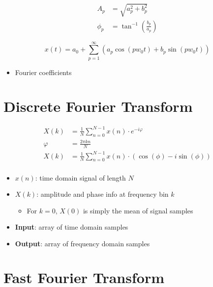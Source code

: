     \begin{align}
      A_{p} &= \sqrt{a_{p}^{2} + b_{p}^{2}} \\
      \phi_{p} &= \tan^{-1} \left( \frac{b_{p}}{a_{p}} \right)
    \end{align}

    \begin{equation}
      x\left( t \right) = a_{0}
        + \sum_{p = 1}^{\infty}
        \left(
          a_{p} \cos\left( p w_{0} t \right)
          + b_{p} \sin\left( p w_{0} t \right)
        \right)
    \end{equation}

    \begin{itemize}
      \item Fourier coefficients
    \end{itemize}

\section{Discrete Fourier Transform}

  \begin{align}
    X\left( k \right) &=
      \frac{1}{N} \sum_{n = 0}^{N - 1} x\left( n \right)
      \cdot e^{-i \varphi} \\
    \varphi &= \frac{2 \pi k n}{N} \\
    X\left( k \right) &=
      \frac{1}{N} \sum_{n = 0}^{N - 1} x\left( n \right)
      \cdot \left( \cos\left( \phi \right) - i \sin\left( \phi \right) \right) \\
  \end{align}

  \begin{itemize}
    \item $ x\left( n \right) $: time domain signal of length $ N $
    \item $ X\left( k \right) $: amplitude and phase info at frequency bin $ k $
    \begin{itemize}
      \item For $ k = 0 $, $ X\left( 0 \right) $ is simply the mean of signal
      samples
    \end{itemize}

    \item \textbf{Input}: array of time domain samples
    \item \textbf{Output}: array of frequency domain samples
  \end{itemize}

\section{Fast Fourier Transform}

